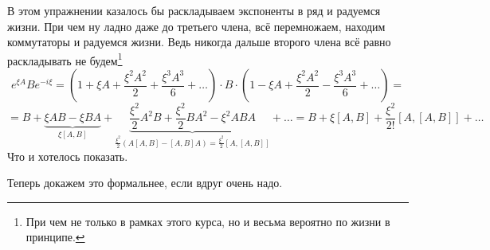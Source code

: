 В этом упражнении казалось бы раскладываем экспоненты в ряд и радуемся жизни. При чем ну ладно даже до третьего члена, всё перемножаем, находим коммутаторы и радуемся жизни. Ведь никогда дальше второго члена всё равно раскладывать не будем\footnote{При чем не только в рамках этого курса, но и весьма вероятно по жизни в принципе.} 
\begin{equation*}
	e^{\xi A} B e^{- i \xi} = \left(1 + \xi A + \frac{\xi^2 A^2}{2} + \frac{\xi^3 A^3}{6} + \ldots\right) \cdot B \cdot \left(1 - \xi A + \frac{\xi^2 A^2}{2} - \frac{\xi^3 A^3}{6} + \ldots\right)
	=
\end{equation*} 
\begin{equation*}
	= B + \underbrace{\xi A B - \xi B A}_{\xi[A,B]} + \underbrace{\frac{\xi^2}{2}  A^2 B + \frac{\xi^2}{2} B A^2 - \xi^2 A B A}_{\frac{\xi^2}{2} (A [A,B] - [A,B] A) = \frac{\xi^2}{2}[A, [A,B]]} + \ldots
	=
	B + \xi[A,B] + \frac{\xi^2}{2!}[A, [A,B]] + \ldots
\end{equation*}
Что и хотелось показать.

Теперь докажем это формальнее, если вдруг очень надо.

